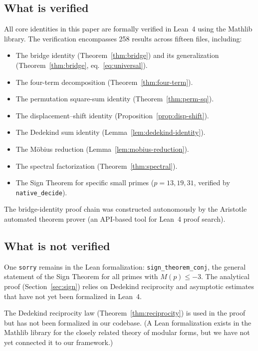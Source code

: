 \documentclass[11pt]{article}
\theoremstyle{definition}
\begin{document}
\subsection{What is verified}\label{sec:lean-verified}

All core identities in this paper are formally verified in
Lean~4 using the Mathlib library.  The verification encompasses
258 results across fifteen files, including:

\begin{itemize}
  \item The bridge identity (Theorem~\ref{thm:bridge}) and its
    generalization (Theorem~\ref{thm:bridge}, eq.~\eqref{eq:universal}).
  \item The four-term decomposition (Theorem~\ref{thm:four-term}).
  \item The permutation square-sum identity (Theorem~\ref{thm:perm-sq}).
  \item The displacement--shift identity (Proposition~\ref{prop:disp-shift}).
  \item The Dedekind sum identity (Lemma~\ref{lem:dedekind-identity}).
  \item The M\"obius reduction (Lemma~\ref{lem:mobius-reduction}).
  \item The spectral factorization (Theorem~\ref{thm:spectral}).
  \item The Sign Theorem for specific small primes ($p = 13, 19, 31$,
    verified by \texttt{native\_decide}).
\end{itemize}

The bridge-identity proof chain was constructed autonomously by the
Aristotle automated theorem prover (an API-based tool for Lean~4
proof search).

\subsection{What is not verified}\label{sec:lean-gaps}

One \texttt{sorry} remains in the Lean formalization:
\texttt{sign\_theorem\_conj}, the general statement of the Sign
Theorem for all primes with $M(p) \le -3$.  The analytical proof
(Section~\ref{sec:sign}) relies on Dedekind reciprocity and
asymptotic estimates that have not yet been formalized in Lean~4.

The Dedekind reciprocity law (Theorem~\ref{thm:reciprocity}) is
used in the proof but has not been formalized in our codebase.
(A Lean formalization exists in the Mathlib library for the
closely related theory of modular forms, but we have not yet
connected it to our framework.)
\end{document}
